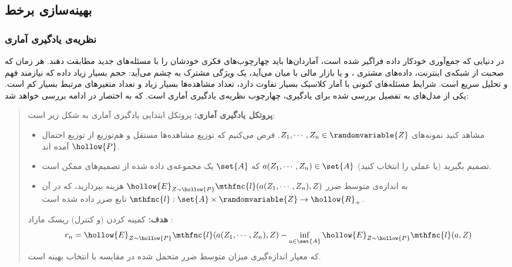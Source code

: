 
% 
%
%
%
%
%
%
%
%
%
%
%

\subsection{
بهینه‌سازی برخط
\cite{onlinelearningbubeck}
}

\subsubsection{
نظریه‌ی یادگیری آماری
}

در دنیایی که جمع‌آوری خودکار داده فراگیر شده است، آماردان‌ها باید چهارچوب‌های فکری خودشان را با مسئله‌های جدید مطابقت دهند. هر زمان که صحبت از شبکه‌ی اینترنت، داده‌های مشتری
، و یا بازار مالی
 با میان می‌آید، یک ویژگی مشترک به چشم می‌آید: حجم بسیار زیاد داده که نیازمند فهم و تحلیل سریع است. شرایط مسئله‌های کنونی با آمار کلاسیک بسیار تفاوت دارد، تعداد مشاهده‌ها بسیار زیاد و تعداد متغیرهای مرتبط بسیار کم است. یکی از مدل‌های به تفصیل بررسی شده برای یادگیری، چهارچوب نظریه‌ی یادگیری آماری است. که به اختصار در ادامه بررسی خواهد شد:

\begin{quote}
{\bf
پروتکل
 یادگیری آماری:
} 
پروتکل ابتدایی یادگیری آماری به شکل زیر است:
\begin{itemize}
\item
مشاهد کنید نمونه‌های 
$Z_1, \cdots, Z_n \in \randomvariable{Z}$. 
فرض می‌کنیم که توزیع مشاهده‌ها مستقل و هم‌توزیع
 از توزیع احتمال 
$\hollow{P}$
آمده اند.

\item
تصمیم بگیرید (یا عملی را انتخاب کنید) 
$a( Z_1, \cdots, Z_n ) \in \set{A}$ 
که 
$\set{A}$ 
یک مجموعه‌ی داده شده از تصمیم‌های ممکن است.

\item
به اندازه‌ی متوسط ضرر
$\hollow{E}_{Z \sim \hollow{P}} \mthfnc{l}( a(Z_1,\cdots,Z_n), Z )$ 
هزینه بپردازید، که در آن 
$\mthfnc{l} : \set{A} \times \randomvariable{Z} \rightarrow \hollow{R}_+$ 
تابع ضرر داده شده است.
\end{itemize}

{\bf
هدف:
} 
کمینه کردن (و کنترل) ریسک مازاد
:
\[
r_n = \hollow{E}_{Z \sim \hollow{P}} \mthfnc{l}( a(Z_1, \cdots, Z_n), Z ) - \inf_{a \in \set{A}} \hollow{E}_{Z \sim \hollow{P}} \mthfnc{l} ( a, Z )
\]
که معیار اندازه‌گیری میزان متوسط ضرر متحمل شده در مقایسه با انتخاب بهینه است.

\end{quote}



